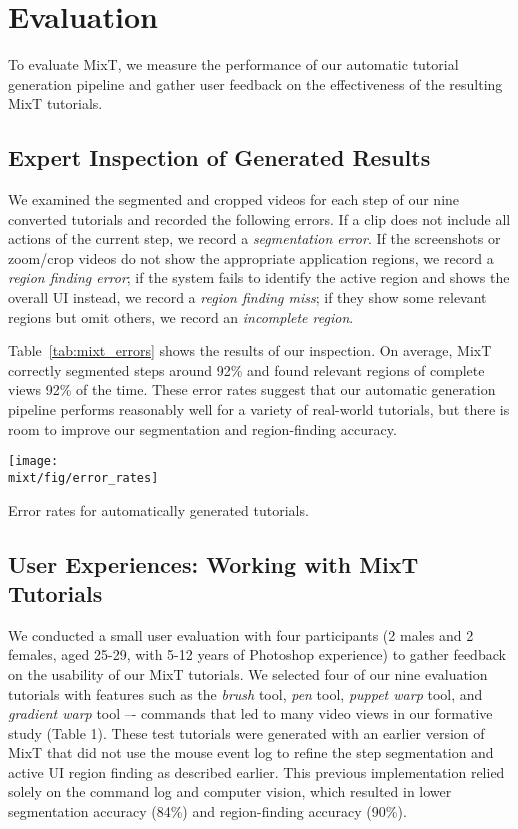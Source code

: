 \section{Evaluation}

To evaluate MixT, we measure the performance of our automatic tutorial generation pipeline and gather user feedback on the effectiveness of the resulting MixT tutorials.

\subsection{Expert Inspection of Generated Results}
We examined the segmented and cropped videos for each step of our nine converted tutorials and recorded the following errors. If a clip does not include all actions of the current step, we record a \emph{segmentation error}. If the screenshots or zoom/crop videos do not show the appropriate application regions, we record a \emph{region finding error}; if the system fails to identify the active region and shows the overall UI instead, we record a \emph{region finding miss}; if they show some relevant regions but omit others, we record an \emph{incomplete region}.

Table~\ref{tab:mixt_errors} shows the results of our inspection. On average, MixT correctly segmented steps around 92\% and found relevant regions of complete views 92\% of the time. These error rates suggest that our automatic generation pipeline performs reasonably well for a variety of real-world tutorials, but there is room to improve our segmentation and region-finding accuracy.

\begin{table}
  \centering
  \texttt{[image: \\mixt/fig/error\_rates]}
  \caption{Error rates for automatically generated tutorials.}
  \label{tab:mixt_errors}
\end{table}


\subsection{User Experiences: Working with MixT Tutorials}
We conducted a small user evaluation with four participants (2 males and 2 females, aged 25-29, with 5-12 years of Photoshop experience) to gather feedback on the usability of our MixT tutorials. We selected four of our nine evaluation tutorials with features such as the \emph{brush} tool, \emph{pen} tool, \emph{puppet warp} tool, and \emph{gradient warp} tool –- commands that led to many video views in our formative study (Table 1). These test tutorials were generated with an earlier version of MixT that did not use the mouse event log to refine the step segmentation and active UI region finding as described earlier. This previous implementation relied solely on the command log and computer vision, which resulted in lower segmentation accuracy (84\%) and region-finding accuracy (90\%).

